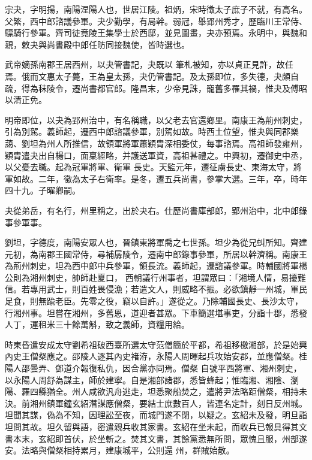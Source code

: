 
\begin{pinyinscope}

 宗夬，字明揚，南陽涅陽人也，世居江陵。祖炳，宋時徵太子庶子不就，有高名。父繁，西中郎諮議參軍。夬少勤學，有局幹。弱冠，舉郢州秀才，歷臨川王常侍、驃騎行參軍。齊司徒竟陵王集學士於西邸，並見圖畫，夬亦預焉。永明中，與魏和親，敕夬與尚書殿中郎任昉同接魏使，皆時選也。



 武帝嫡孫南郡王居西州，以夬管書記，夬既以
 筆札被知，亦以貞正見許，故任焉。俄而文惠太子薨，王為皇太孫，夬仍管書記。及太孫即位，多失德，夬頗自疏，得為秣陵令，遷尚書都官郎。隆昌末，少帝見誅，寵舊多罹其禍，惟夬及傅昭以清正免。



 明帝即位，以夬為郢州治中，有名稱職，以父老去官還鄉里。南康王為荊州刺史，引為別駕。義師起，遷西中郎諮議參軍，別駕如故。時西土位望，惟夬與同郡樂藹、劉坦為州人所推信，故領軍將軍蕭穎胄深相委仗，每事諮焉。高祖師發雍州，穎胄遣夬出自楊口，面稟經略，并護送軍資，高祖甚禮之。中興初，遷御史中丞，以父憂去職。起為冠軍將軍、衛軍
 長史。天監元年，遷征虜長史、東海太守，將軍如故。二年，徵為太子右衛率。是冬，遷五兵尚書，參掌大選。三年，卒，時年四十九。子曜卿嗣。



 夬從弟岳，有名行，州里稱之，出於夬右。仕歷尚書庫部郎，郢州治中，北中郎錄事參軍事。



 劉坦，字德度，南陽安眾人也，晉鎮東將軍喬之七世孫。坦少為從兄虯所知。齊建元初，為南郡王國常侍，尋補孱陵令，遷南中郎錄事參軍，所居以幹濟稱。南康王為荊州刺史，坦為西中郎中兵參軍，領長流。義師起，遷諮議參軍。時輔國將軍楊公則為湘州刺史，帥師赴夏口，
 西朝議行州事者，坦謂眾曰：「湘境人情，易擾難信。若專用武士，則百姓畏侵漁；若遣文人，則威略不振。必欲鎮靜一州城，軍民足食，則無踰老臣。先零之役，竊以自許。」遂從之。乃除輔國長史、長沙太守，行湘州事。坦嘗在湘州，多舊恩，道迎者甚眾。下車簡選堪事吏，分詣十郡，悉發人丁，運租米三十餘萬斛，致之義師，資糧用給。



 時東昏遣安成太守劉希祖破西臺所選太守范僧簡於平都，希祖移檄湘部，於是始興內史王僧粲應之。邵陵人逐其內史褚洊，永陽人周暉起兵攻始安郡，並應僧粲。桂陽人邵曇弄、鄧道介報復私仇，因合黨亦同焉。僧粲
 自號平西將軍、湘州刺史，以永陽人周舒為謀主，師於建寧。自是湘部諸郡，悉皆蜂起；惟臨湘、湘陰、瀏陽、羅四縣猶全。州人咸欲汎舟逃走，坦悉聚船焚之，遣將尹法略距僧粲，相持未決。前湘州鎮軍鐘玄紹潛謀應僧粲，要結士庶數百人，皆連名定計，刻日反州城。坦聞其謀，偽為不知，因理訟至夜，而城門遂不閉，以疑之。玄紹未及發，明旦詣坦問其故。坦久留與語，密遣親兵收其家書。玄紹在坐未起，而收兵已報具得其文書本末，玄紹即首伏，於坐斬之。焚其文書，其餘黨悉無所問，眾愧且服，州部遂安。法略與僧粲相持累月，建康城平，公則還
 州，群賊始散。




\end{pinyinscope}
